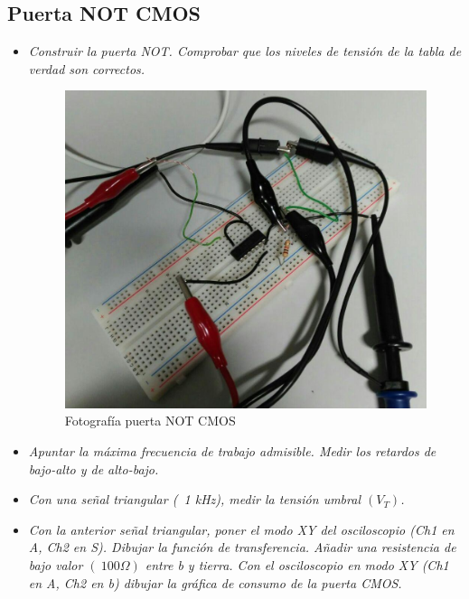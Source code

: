 \documentclass[paper=a4, fontsize=11pt]{scrartcl} %
\numberwithin{equation}{section} %
\numberwithin{figure}{section} %
\numberwithin{table}{section} %
\begin{document}
\subsection{Puerta NOT CMOS \cite{2c}}

\begin{itemize}
	\item \textit{Construir la puerta NOT. Comprobar que los niveles de tensión de la tabla de verdad son correctos.}
	
	\begin{figure}[H]
		\centering
		\includegraphics[scale=0.4]{image/NOT5A}
		\caption{Fotografía puerta NOT CMOS}
		\label{fig:prac-5a-notA}
	\end{figure}
	
	\item \textit{Apuntar la máxima frecuencia de trabajo admisible. Medir los retardos de bajo-alto y de alto-bajo.}
	\item \textit{Con una señal triangular (~1 kHz), medir la tensión umbral $ (V_{T}) $.}
	\item \textit{Con la anterior señal triangular, poner el modo XY del osciloscopio (Ch1 en A, Ch2 en S). Dibujar la función de transferencia. Añadir una resistencia de bajo valor $ (~100 \Omega) $ entre b y tierra. Con el osciloscopio en modo XY (Ch1 en A, Ch2 en b) dibujar la gráfica de consumo de la puerta CMOS.}
\end{itemize}
\end{document}
